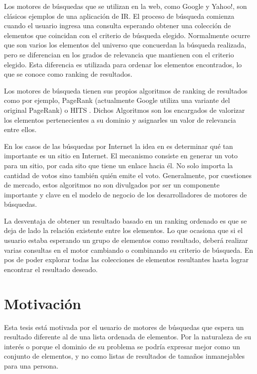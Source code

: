 Los motores de búsquedas que se utilizan en la web, como Google y Yahoo!, son clásicos ejemplos de una aplicación de IR. El proceso de búsqueda comienza cuando el usuario ingresa una consulta esperando obtener una colección de elementos que coincidan con el criterio de búsqueda elegido. Normalmente ocurre que son varios los elementos del universo que concuerdan la búsqueda realizada, pero se diferencian en los grados de relevancia que mantienen con el criterio elegido. Esta diferencia es utilizada para ordenar los elementos encontrados, lo que se conoce como ranking de resultados.

Los motores de búsqueda tienen sus propios algoritmos de ranking de resultados como por ejemplo, PageRank (actualmente Google utiliza una variante del original PageRank) \cite{Brin:1998:ALH:297810.297827} o HITS \cite{Kleinberg:1999:ASH:324133.324140}. Dichos Algoritmos son los encargados de valorizar los elementos pertenecientes a su dominio y asignarles un valor de relevancia entre ellos. 

En los casos de las búsquedas por Internet la idea en \cite{Brin:1998:ALH:297810.297827} es determinar qué tan importante es un sitio en Internet. El mecanismo consiste en generar un voto para un sitio, por cada sito que tiene un enlace hacia él. No solo importa la cantidad de votos sino también quién emite el voto. Generalmente, por cuestiones de mercado, estos algoritmos no son divulgados por ser un componente importante y clave en el modelo de negocio de los desarrolladores de motores de búsquedas. 

La desventaja de obtener un resultado basado en un ranking ordenado es que se deja de lado la relación existente entre los elementos. Lo que ocasiona que si el usuario estaba esperando un grupo de elementos como resultado, deberá realizar varias consultas en el motor cambiando o combinando su criterio de búsqueda. En pos de poder explorar todas las colecciones de elementos resultantes hasta lograr encontrar el resultado deseado.

\section{Motivación}
Esta tesis está motivada por el usuario de motores de búsquedas que espera un resultado diferente al de una lista ordenada de elementos. Por la naturaleza de su interés o porque el dominio de su problema se podría expresar mejor como un conjunto de elementos, y no como listas de resultados de tamaños inmanejables para una persona.

